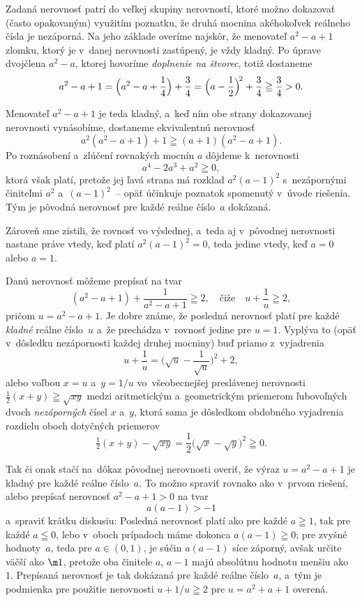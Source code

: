 {%
Zadaná nerovnosť patrí do veľkej skupiny
nerovností, ktoré možno dokazovať (často opakovaným) využitím poznatku,
že druhá mocnina akéhokoľvek reálneho čísla je nezáporná.
Na jeho základe overíme najskôr, že menovateľ $a^2-a+1$ zlomku,
ktorý je v~danej nerovnosti zastúpený, je vždy kladný.
Po úprave dvojčlena $a^2-a$,
ktorej hovoríme {\it doplnenie na štvorec}, totiž dostaneme
$$
a^2-a+1=\Bigl(a^2-a+\frac14\Bigr)+\frac34
=\Bigl(a-\frac12\Bigr)^{\!2}+\frac34\geqq\frac34>0.
$$

Menovateľ $a^2-a+1$ je teda kladný, a~keď ním obe strany dokazovanej nerovnosti vynásobíme, dostaneme
ekvivalentnú nerovnosť
$$
a^2(a^2-a+1)+1\geqq(a+1)(a^2-a+1).
$$
Po roznásobení a~zlúčení rovnakých mocnín $a$ dôjdeme k~nerovnosti
$$
a^4-2a^3+a^2\geqq0,
$$
ktorá však platí, pretože jej ľavá strana má rozklad
$a^2(a-1)^2$ s~nezápornými činiteľmi $a^2$ a~$(a-1)^2$~--
opäť účinkuje poznatok spomenutý v~úvode riešenia.
Tým je pôvodná nerovnosť pre každé reálne číslo~$a$ dokázaná.

Zároveň sme zistili, že rovnosť vo výslednej, a~teda
aj v~pôvodnej nerovnosti nastane
práve vtedy, keď platí $a^2(a-1)^2=0$, teda jedine vtedy, keď $a=0$ alebo $a=1$.

\ineriesenie
Danú nerovnosť môžeme prepísať na tvar
$$
(a^2-a+1)+\frac{1}{a^2-a+1}\geqq2,\quad\text{čiže}\quad
u+\frac{1}{u}\geqq2,
$$
pričom $u=a^2-a+1$. Je dobre známe, že posledná nerovnosť platí pre
každé {\it kladné\/} reálne číslo~$u$ a~že prechádza v~rovnosť
jedine pre $u=1$. Vyplýva to (opäť v~dôsledku nezápornosti každej
druhej mocniny) buď priamo z~vyjadrenia
$$
u+\frac{1}{u}=\biggl(\sqrt{u}-\frac{1}{\sqrt{u}}\biggr)^{\!\!2}+2,
$$
alebo voľbou $x=u$ a~$y=1/u$ vo~všeobecnejšej preslávenej
nerovnosti $\frac12(x+y)\geqq\sqrt{xy}$ medzi aritmetickým
a~geometrickým priemerom ľubovoľných dvoch {\it nezáporných\/} čísel
$x$ a~$y$, ktorá sama je dôsledkom obdobného vyjadrenia
rozdielu oboch dotyčných priemerov
$$
\tfrac12(x+y)-\sqrt{xy}=\frac12\bigl(\sqrt{x}-\sqrt{y}\bigr)^2\geqq0.
$$

Tak či onak stačí na~dôkaz pôvodnej nerovnosti overiť,
že výraz $u=a^2-a+1$ je kladný pre každé reálne
číslo~$a$. To možno spraviť rovnako ako v~prvom riešení, alebo
prepísať nerovnosť $a^2-a+1>0$ na tvar
$$
a(a-1)>-1
$$
a~spraviť krátku diskusiu: Posledná nerovnosť platí ako pre každé $a\geqq1$,
tak pre každé $a\leqq0$, lebo v~oboch prípadoch máme
dokonca $a(a-1)\geqq0$; pre zvyšné hodnoty~$a$,
teda pre $a\in(0, 1)$, je súčin $a(a-1)$ síce záporný,
avšak určite väčší ako ${\m1}$, pretože oba činitele $a$, $a-1$
majú absolútnu hodnotu menšiu ako~$1$. Prepísaná nerovnosť je tak
dokázaná pre každé reálne číslo~$a$, a~tým je podmienka pre použitie
nerovnosti $u+1/u\geqq2$ pre $u=a^2+a+1$ overená.

}
